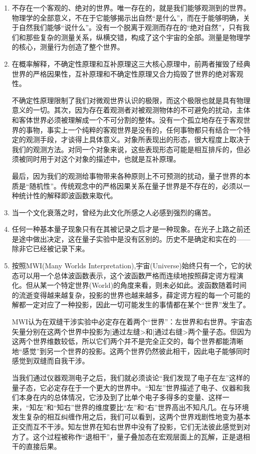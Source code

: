 \documentclass[UTF8]{ctexart}
\begin{document}
\begin{enumerate}
			\item 不存在一个客观的、绝对的世界。唯一存在的，就是我们能够观测到的世界。物理学的全部意义，不在于它能够揭示出自然“是什么”，而在于能够明确，关于自然我们能够“说什么”。没有一个脱离于观测而存在的“绝对自然”，只有我们和那些复杂的测量关系，纵横交错，构成了这个宇宙的全部。测量是物理学的核心，测量行为创造了整个世界。
			
			\item 在概率解释，不确定性原理和互补原理这三大核心原理中，前两者摧毁了经典世界的严格因果性，互补原理和不确定性原理又合力捣毁了世界的绝对客观性。
			
			不确定性原理限制了我们对微观世界认识的极限，而这个极限也就是具有物理意义的一切。其次，因为存在着观测者对被观测物体的不可避免的扰动，主体和客体世界必须被理解成一个不可分割的整体。没有一个孤立地存在于客观世界的事物，事实上一个纯粹的客观世界是没有的，任何事物都只有结合一个特定的观测手段，才谈得上具体意义。对象所表现出的形态，很大程度上取决于我们的观测方法。对同一个对象来说，这些表现形态可能是相互排斥的，但必须被同时用于对这个对象的描述中，也就是互补原理。
			
			最后，因为我们的观测给事物带来各种原则上不可预测的扰动，量子世界的本质是“随机性”。传统观念中的严格因果关系在量子世界是不存在的，必须以一种统计性的解释即波函数来取代。
			
			\item 当一个文化衰落之时，曾经为此文化所感之人必感到强烈的痛苦。
			
			\item 任何一种基本量子现象只有在其被记录之后才是一种现象。在光子上路之前还是途中做出决定，这在量子实验中是没有区别的。历史不是确定和实在的——除非它已经被记录下来。
			
			\item 按照MWI(Many Worlds Interpretation),宇宙(Universe)始终只有一个，它的状态可以用一个总体波函数表示，这个波函数严格而连续地按照薛定谔方程演化。但从某一个特定世界(World)的角度来看，则未必如此。波函数随着时间的流逝变得越来越复杂，投影的世界也越来越多，薛定谔方程的每一个可能的解都一定对应了一种投影，因此一切可能发生的事情都在某个“世界”发生了。
			
			MWI认为在双缝干涉实验中必定存在着两个“世界”：左世界和右世界。宇宙态矢量分别在这两个世界中投影为|通过左缝>和|通过右缝>两个量子态。但因为这两个世界维数较低，所以它们两个并不是完全正交的，每个世界都能清晰地“感觉”到另一个世界的投影。这两个世界仍然彼此相干，因此电子能够同时感觉到双缝而自我干涉。
			
			当我们通过仪器观测电子之后，我们就必须谈论“我们发现了电子在左”这样的量子态，它必定存在于一个更大的世界中。“知左”世界描述了电子、仪器和我们本身在内的总体情况，它涉及到了比单个电子多得多的变量、这样一来，“知左”和“知右”世界的维度要比“左”和“右”世界高出不知凡几。在与环境发生复杂的相互纠缠作用之后，我们可以看到，这两个世界戏剧性地变为基本正交而互不干涉。知左世界在知右世界中没有了投影，它们无法彼此感觉到对方了。这个过程被称作“退相干”，量子叠加态在宏观层面上的瓦解，正是退相干的直接后果。
			

\end{enumerate}
\end{document}
